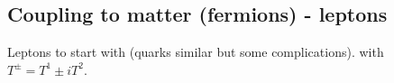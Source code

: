 \documentclass{article}
\begin{document}
\subsection{Coupling to matter (fermions) - leptons}
Leptons to start with (quarks similar but some complications). 
with $T^\pm = T^1 \pm i T^2$.
\end{document}
